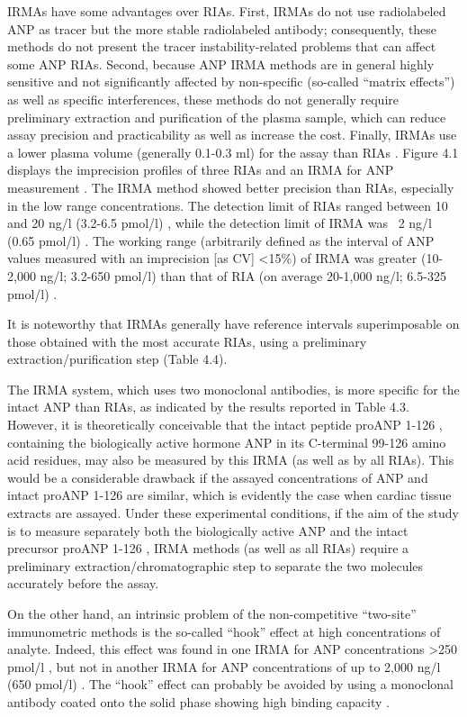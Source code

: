 \documentclass[14pt,a4paper,onecolumn]{extarticle}
\begin{document}
IRMAs have some advantages over RIAs. First, IRMAs do not use radiolabeled ANP as
tracer but the more stable radiolabeled antibody; consequently, these methods do not
present the tracer instability-related problems that can affect some ANP RIAs. Second,
because ANP IRMA methods are in general highly sensitive and not significantly affected by non-specific (so-called “matrix effects”) as well as specific interferences, these methods do not generally require preliminary extraction and purification of the plasma sample, which can reduce assay precision and practicability as well as increase the cost. Finally, IRMAs use a lower plasma volume (generally 0.1-0.3 ml) for the assay than RIAs \citep{bib237}.
Figure 4.1 displays the imprecision profiles of three RIAs and an IRMA for ANP
measurement \citep{bib229} \citep{bib230} \citep{bib237}. The IRMA method showed better precision than RIAs, especially in the low range concentrations. The detection limit of RIAs ranged between 10
and 20 ng/l (3.2-6.5 pmol/l) \citep{bib229} \citep{bib230}, while the detection limit of IRMA was ~2 ng/l (0.65
pmol/l) \citep{bib237}. The working range (arbitrarily defined as the interval of ANP values measured with an imprecision [as CV] <15\%) of IRMA was greater (10-2,000 ng/l; 3.2-650
pmol/l) than that of RIA (on average 20-1,000 ng/l; 6.5-325 pmol/l) \citep{bib230} \citep{bib237}.

It is noteworthy that IRMAs generally have reference intervals superimposable on
those obtained with the most accurate RIAs, using a preliminary extraction/purification
step (Table 4.4).

The IRMA system, which uses two monoclonal antibodies, is more specific for the
intact ANP than RIAs, as indicated by the results reported in Table 4.3. However, it is
theoretically conceivable that the intact peptide proANP 1-126 , containing the biologically active hormone ANP in its C-terminal 99-126 amino acid residues, may also be measured by this IRMA (as well as by all RIAs). This would be a considerable drawback if the
assayed concentrations of ANP and intact proANP 1-126 are similar, which is evidently the
case when cardiac tissue extracts are assayed. Under these experimental conditions, if the
aim of the study is to measure separately both the biologically active ANP and the intact
precursor proANP 1-126 , IRMA methods (as well as all RIAs) require a preliminary extraction/chromatographic step to separate the two molecules accurately before the assay.

On the other hand, an intrinsic problem of the non-competitive “two-site” immunometric methods is the so-called “hook” effect at high concentrations of analyte. Indeed,
this effect was found in one IRMA for ANP concentrations >250 pmol/l \citep{bib235}, but not in
another IRMA for ANP concentrations of up to 2,000 ng/l (650 pmol/l) \citep{bib237}. The “hook”
effect can probably be avoided by using a monoclonal antibody coated onto the solid
phase showing high binding capacity \citep{bib234}.
\end{document}
